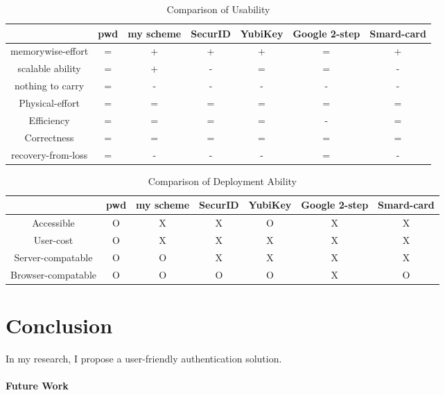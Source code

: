 \begin{CJK}{Bg5}{bsmi}
\begin{table}[h]
\begin{tabular}{|c|c|c|c|c|c|c|}
\hline
                   & pwd & my scheme & SecurID & YubiKey & Google 2-step & Smard-card \\ \hline
memorywise-effort  & =   & +         & +       & +       & =             & +          \\ \hline
scalable ability   & =   & +         & -       & =       & =             & -          \\ \hline
nothing to carry   & =   & -         & -       & -       & -             & -          \\ \hline
Physical-effort    & =   & =         & =       & =       & =             & =          \\ \hline
Efficiency         & =   & =         & =       & =       & -             & =          \\ \hline
Correctness        & =   & =         & =       & =       & =             & =          \\ \hline
recovery-from-loss & =   & -         & -       & -       & =             & -          \\ \hline
\end{tabular}
\caption{Comparison of Usability}
\end{table}

\begin{table}[h]
\begin{tabular}{|c|c|c|c|c|c|c|}
\hline
                   & pwd & my scheme & SecurID & YubiKey & Google 2-step & Smard-card \\ \hline
Accessible         & O   & X         & X       & O       & X             & X          \\ \hline
User-cost          & O   & X         & X       & X       & X             & X          \\ \hline
Server-compatable  & O   & O         & X       & X       & X             & X          \\ \hline
Browser-compatable & O   & O         & O       & O       & X             & O          \\ \hline
\end{tabular}
\caption{Comparison of Deployment Ability}
\end{table}

\chapter{Conclusion}

In my research, I propose a user-friendly authentication solution.

\subsubsection{Future Work}

\end{CJK}